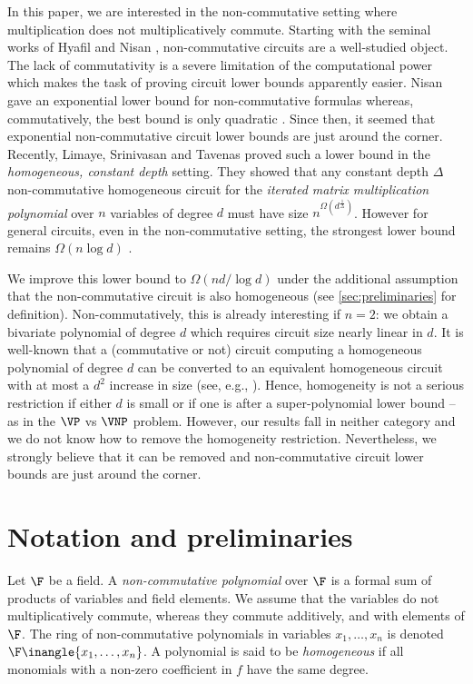 \documentclass[11pt]{article}
\begin{document}
In this paper, we are interested in the non-commutative setting where multiplication does not multiplicatively commute. 
Starting with the seminal works of Hyafil \cite{Hya77} and Nisan \cite{Nis91}, non-commutative circuits are a well-studied object. 
The lack of commutativity is a severe limitation of the computational power which makes the task of proving circuit lower bounds apparently easier. 
Nisan gave an exponential lower bound for non-commutative formulas whereas, commutatively, the best bound is only quadratic \cite{Kal85, CKSV22}. 
Since then, it seemed that exponential non-commutative circuit lower bounds are just around the corner.  
Recently, Limaye, Srinivasan and Tavenas \cite{TLS22} proved such a lower bound in the \emph{homogeneous, constant depth} setting.
They showed that any constant depth $\Delta$ non-commutative homogeneous circuit for the \emph{iterated matrix multiplication polynomial} over $n$ variables of degree $d$ must have size $n^{\Omega(d^{\frac{1}{\Delta}})}$.
However for general circuits, even in the non-commutative setting, the strongest lower bound remains $\Omega(n\log d)$ \cite{Str73, BS83}. 

We improve this lower bound to $\Omega(nd/\log d)$ under the additional assumption that the non-commutative circuit is also homogeneous (see \autoref{sec:preliminaries} for definition). 
Non-commutatively, this is already interesting if $n=2$: we obtain a bivariate polynomial of degree $d$ which requires circuit size nearly linear in $d$. 
It is well-known that a (commutative or not) circuit computing a homogeneous polynomial of degree $d$ can be converted to an equivalent homogeneous circuit with at most a $d^2$ increase in size (see, e.g., \cite{HWY11}). 
Hence, homogeneity is not a serious restriction if either $d$ is small or if one is after a super-polynomial lower bound -- as in the $\VP$ vs $\VNP$ problem. 
However, our results fall in neither category and we do not know how to remove the homogeneity restriction.
Nevertheless, we strongly believe that it can be removed and  non-commutative circuit lower bounds are just around the corner. 

\section{Notation and preliminaries}\label{sec:preliminaries}

Let $\F$ be a field. A \emph{non-commutative polynomial} over $\F$ is a formal sum of products of variables and field elements. We assume that the variables do not multiplicatively commute, whereas they commute additively, and with elements of $\F$. 
The ring of non-commutative polynomials in variables $x_1,\dots, x_n$ is denoted $\F\inangle{x_1,\dots,x_n}$. 
A polynomial is said to be \emph{homogeneous} if all monomials with a non-zero coefficient in $f$ have the same degree. 
\end{document}
